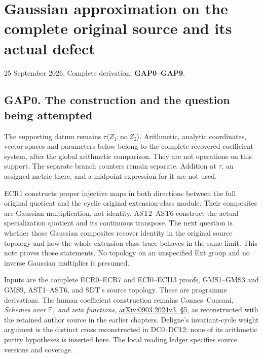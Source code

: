 \section{Gaussian approximation on the complete original source and its
actual
defect}\label{gaussian-approximation-on-the-complete-original-source-and-its-actual-defect}

25 September 2026. Complete derivation, \textbf{GAP0--GAP9}.

\subsection{GAP0. The construction and the question being
attempted}\label{gap0.-the-construction-and-the-question-being-attempted}

The supporting datum remains
\(\tau\langle Z_1;\mathrm{no}\ Z_2\rangle\). Arithmetic, analytic
coordinates, vector spaces and parameters below belong to the complete
recovered coefficient system, after the global arithmetic comparison.
They are not operations on this support. The separate branch counters
remain separate. Addition at \(\tau\), an assigned metric there, and a
midpoint expression for it are not used.

ECR1 constructs proper injective maps in both directions between the
full original quotient and the cyclic original extension-class module.
Their composites are Gaussian multiplication, not identity. AST2--AST6
construct the actual specialization quotient and its continuous
transpose. The next question is whether those Gaussian composites
recover identity in the original source topology and how the whole
extension-class trace behaves in the same limit. This note proves those
statements. No topology on an unspecified Ext group and no inverse
Gaussian multiplier is presumed.

Inputs are the complete ECR0--ECR7 and ECI0--ECI13 proofs, GMS1--GMS3
and GMS9, AST1--AST6, and SDT's source topology. These are programme
derivations. The human coefficient construction remains Connes--Consani,
\emph{Schemes over} \(\mathbb F_1\) \emph{and zeta functions},
\href{https://arxiv.org/abs/0903.2024v3}{arXiv:0903.2024v3, §5}, as
reconstructed with the retained author source in the earlier chapters.
Deligne's invariant-cycle weight argument is the distinct cross
reconstructed in DC0--DC12; none of its arithmetic purity hypotheses is
inserted here. The local reading ledger specifies source versions and
coverage.

